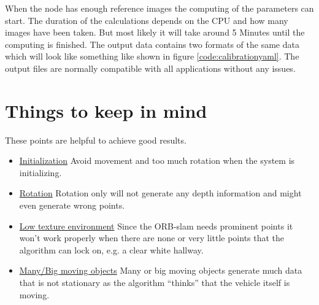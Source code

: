 When the node has enough reference images the computing of the parameters can start. The duration of the calculations depends on the CPU and how many images have been taken. But most likely it will take around 5 Minutes until the computing is finished. The output data contains two formats of the same data which will look like something like shown in figure \ref{code:calibrationyaml}. The output files are normally compatible with all applications without any issues.\newline



\section{Things to keep in mind}\label{ref:orbslamgetgoodresults}
These points are helpful to achieve good results.
\begin{itemize}
    \item \underline{Initialization} \newline
    Avoid movement and too much rotation when the system is initializing.
    
    \item \underline{Rotation} \newline
    Rotation only will not generate any depth information and might even generate wrong points.
    
    \item \underline{Low texture environment} \newline
    Since the ORB-\gls{slam} needs prominent points it won't work properly when there are none or very little points that the algorithm can lock on, e.g. a clear white hallway.
    
    \item \underline{Many/Big moving objects} \newline
    Many or big moving objects generate much data that is not stationary as the algorithm \enquote{thinks} that the vehicle itself is moving.
    
\end{itemize}



